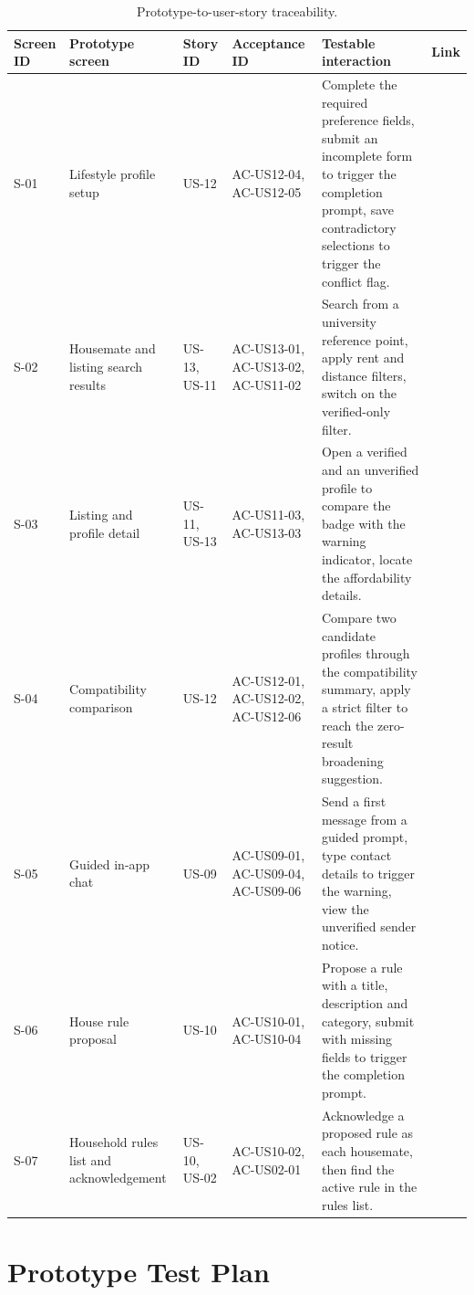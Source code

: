 \documentclass[11pt,a4paper]{article}
\begin{document}
\begin{table}[H]
    \centering
    \scriptsize
    \caption{Prototype-to-user-story traceability.}
    \begin{tabularx}{\textwidth}{@{}L{1.1cm}L{2.7cm}L{1.5cm}L{2.5cm}Y L{1.5cm}@{}}
        \toprule
        Screen ID & Prototype screen & Story ID & Acceptance ID & Testable interaction & Link\\
        \midrule
        S-01 & Lifestyle profile setup & US-12 & AC-US12-04, AC-US12-05 & Complete the required preference fields, submit an incomplete form to trigger the completion prompt, save contradictory selections to trigger the conflict flag. & \\
        S-02 & Housemate and listing search results & US-13, US-11 & AC-US13-01, AC-US13-02, AC-US11-02 & Search from a university reference point, apply rent and distance filters, switch on the verified-only filter. & \\
        S-03 & Listing and profile detail & US-11, US-13 & AC-US11-03, AC-US13-03 & Open a verified and an unverified profile to compare the badge with the warning indicator, locate the affordability details. & \\
        S-04 & Compatibility comparison & US-12 & AC-US12-01, AC-US12-02, AC-US12-06 & Compare two candidate profiles through the compatibility summary, apply a strict filter to reach the zero-result broadening suggestion. & \\
        S-05 & Guided in-app chat & US-09 & AC-US09-01, AC-US09-04, AC-US09-06 & Send a first message from a guided prompt, type contact details to trigger the warning, view the unverified sender notice. & \\
        S-06 & House rule proposal & US-10 & AC-US10-01, AC-US10-04 & Propose a rule with a title, description and category, submit with missing fields to trigger the completion prompt. & \\
        S-07 & Household rules list and acknowledgement & US-10, US-02 & AC-US10-02, AC-US02-01 & Acknowledge a proposed rule as each housemate, then find the active rule in the rules list. & \\
        \bottomrule
    \end{tabularx}
    \label{tabprototypetraceability}
\end{table}

\section{Prototype Test Plan}
\label{sectestplan}
\end{document}
